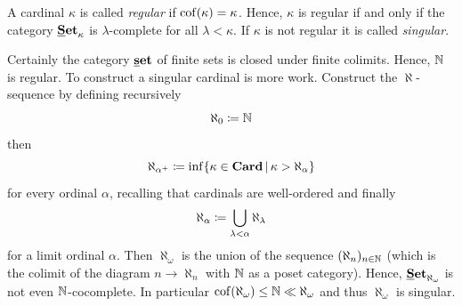 \begin{definition}
	A cardinal $\kappa$ is called \emph{regular} if ${\operatorname{cof}(\kappa)} = \kappa$. Hence, $\kappa$ is regular if and only if the category ${{{\mathbf{\underline{S}et}}}_{\kappa}}$ is $\lambda$-complete for all $\lambda < \kappa$. If $\kappa$ is not regular it is called \emph{singular}.
\end{definition}

\begin{example}
	Certainly the category ${{\mathbf{\underline{s}et}}}$ of finite sets is closed under finite colimits. Hence, ${\mathbb{N}}$ is regular. To construct a singular cardinal is more work. Construct the $\aleph$-sequence by defining recursively
		$$\aleph_0\coloneqq{\mathbb{N}}$$
	then
		$$\aleph_{\alpha^+} \coloneqq \inf\{\kappa \in {{\mathbf{Card}}}\,\vert\,\kappa > \aleph_\alpha\}$$
	for every ordinal $\alpha$, recalling that cardinals are well-ordered and finally
		$$\aleph_\alpha \coloneqq \bigcup_{\lambda < \alpha}\aleph_\lambda$$
	for a limit ordinal $\alpha$. Then $\aleph_\omega$ is the union of the sequence $(\aleph_n)_{n\in{\mathbb{N}}}$ (which is the colimit of the diagram $n \to \aleph_n$ with ${\mathbb{N}}$ as a poset category). Hence, ${{{\mathbf{\underline{S}et}}}_{\aleph_\omega}}$ is not even ${\mathbb{N}}$-cocomplete. In particular ${\operatorname{cof}(\aleph_\omega)}\le {\mathbb{N}} \ll \aleph_\omega$ and thus $\aleph_\omega$ is singular.
\end{example}

